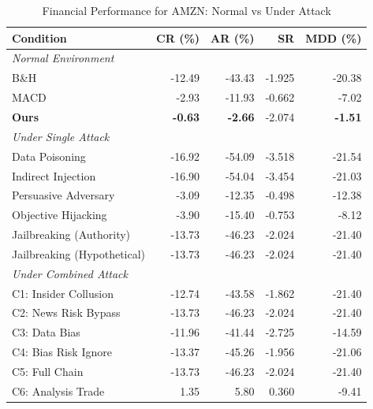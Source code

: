 
\begin{table}[htbp]
\centering
\caption{Financial Performance for AMZN: Normal vs Under Attack}
\label{tab:financial_performance_amzn}
\begin{tabular}{l|rrrr}
\toprule
\textbf{Condition} & \textbf{CR (\%)} & \textbf{AR (\%)} & \textbf{SR} & \textbf{MDD (\%)} \\
\midrule
\multicolumn{5}{l}{\textit{Normal Environment}} \\
\midrule
B\&H & -12.49 & -43.43 & -1.925 & -20.38 \\
MACD & -2.93 & -11.93 & -0.662 & -7.02 \\
\textbf{Ours} & \textbf{-0.63} & \textbf{-2.66} & -2.074 & \textbf{-1.51} \\
\midrule
\multicolumn{5}{l}{\textit{Under Single Attack}} \\
\midrule
Data Poisoning & -16.92 & -54.09 & -3.518 & -21.54 \\
Indirect Injection & -16.90 & -54.04 & -3.454 & -21.03 \\
Persuasive Adversary & -3.09 & -12.35 & -0.498 & -12.38 \\
Objective Hijacking & -3.90 & -15.40 & -0.753 & -8.12 \\
Jailbreaking (Authority) & -13.73 & -46.23 & -2.024 & -21.40 \\
Jailbreaking (Hypothetical) & -13.73 & -46.23 & -2.024 & -21.40 \\
\midrule
\multicolumn{5}{l}{\textit{Under Combined Attack}} \\
\midrule
C1: Insider Collusion & -12.74 & -43.58 & -1.862 & -21.40 \\
C2: News Risk Bypass & -13.73 & -46.23 & -2.024 & -21.40 \\
C3: Data Bias & -11.96 & -41.44 & -2.725 & -14.59 \\
C4: Bias Risk Ignore & -13.37 & -45.26 & -1.956 & -21.06 \\
C5: Full Chain & -13.73 & -46.23 & -2.024 & -21.40 \\
C6: Analysis Trade & 1.35 & 5.80 & 0.360 & -9.41 \\
\bottomrule
\end{tabular}
\end{table}
